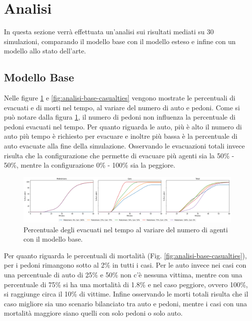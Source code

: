 \newpage


\section{Analisi}
\label{sec:analisi}
In questa sezione verrà effettuata un'analisi sui risultati mediati su 30 simulazioni, 
comparando il modello base con il modello esteso e infine con un modello allo stato dell'arte.

\subsection{Modello Base}
Nelle figure \ref{fig:analisi-base-evacuated} e \ref{fig:analisi-base-casualties} vengono mostrate le percentuali di evacuati 
e di morti nel tempo, al variare del numero di auto e pedoni.
%
Come si può notare dalla figura \ref{fig:analisi-base-evacuated}, il numero di pedoni non influenza la percentuale di pedoni evacuati nel tempo.
%
Per quanto riguarda le auto, più è alto il numero di auto più tempo è richiesto per evacuare e inoltre più bassa è la percentuale di auto evacuate alla fine della simulazione.
%
Osservando le evacuazioni totali invece risulta che la configurazione che permette di evacuare più agenti sia la 50\% - 50\%, mentre la configurazione 0\% - 100\% sia la peggiore.

\begin{figure}[ht]
    \centering
    \includegraphics[width=\textwidth]{images/analisi/base-evacuated.png}
    \caption{Percentuale degli evacuati nel tempo al variare del numero di agenti con il modello base.}
    \label{fig:analisi-base-evacuated}
\end{figure}

Per quanto riguarda le percentuali di mortalità (Fig. \ref{fig:analisi-base-casualties}), per i pedoni rimangono sotto al 2\% in tutti i casi.
%
Per le auto invece nei casi con una percentuale di auto di 25\% e 50\% non c'è nessuna vittima, mentre 
con una percentuale di 75\% si ha una mortalità di 1.8\% e nel caso peggiore, ovvero 100\%, si raggiunge circa il 10\% di vittime.
%
Infine osservando le morti totali risulta che il caso migliore sia uno scenario bilanciato tra auto e pedoni, 
mentre i casi con una mortalità maggiore siano quelli con solo pedoni o solo auto.

